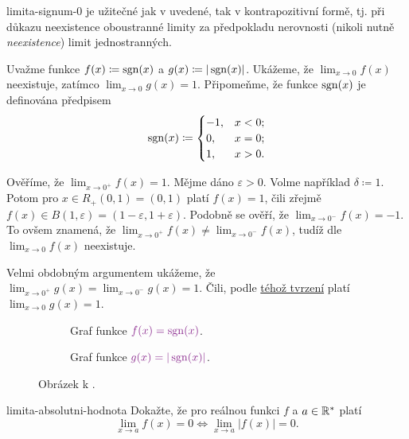 \begin{example}{}{limita-signum-0}
  je užitečné
 jak v uvedené, tak v kontrapozitivní formě, tj. při důkazu neexistence
 oboustranné limity za předpokladu nerovnosti (nikoli nutně \emph{neexistence})
 limit jednostranných.

 Uvažme funkce $f(x) \coloneqq \operatorname{sgn}(x)$ a $g(x) \coloneqq |\operatorname{sgn}(x)|$. Ukážeme,
 že $\lim_{x \to 0} f(x)$ neexistuje, zatímco $\lim_{x \to 0} g(x) = 1$.
 Připomeňme, že funkce $\operatorname{sgn}(x)$ je definována předpisem
 \[
  \operatorname{sgn}(x) \coloneqq \begin{cases}
   -1, & x < 0;\\
   0, & x = 0;\\
   1, & x > 0.
  \end{cases}
 \]

 Ověříme, že $\lim_{x \to 0^{+}} f(x) = 1$. Mějme dáno $\varepsilon>0$. Volme
 například $\delta \coloneqq 1$. Potom pro $x \in R_+(0,1) = (0,1)$ platí $f(x)
 = 1$, čili zřejmě $f(x) \in B(1,\varepsilon) = (1-\varepsilon,1+\varepsilon)$.
 Podobně se ověří, že $\lim_{x \to 0^{-}} f(x) = -1$. To ovšem znamená, že
 $\lim_{x \to 0^{+}} f(x) \neq \lim_{x \to 0^{-}} f(x)$, tudíž dle
  $\lim_{x \to
 0} f(x)$ neexistuje.

 Velmi obdobným argumentem ukážeme, že $\lim_{x \to 0^{+}} g(x) = \lim_{x \to
 0^{-}} g(x) = 1$. Čili, podle
 \hyperref[prop:vztah-jednostrannych-a-oboustrannych-limit]{téhož tvrzení} platí
 $\lim_{x \to 0} g(x) = 1$.
\end{example}

\begin{figure}[ht]
 \centering
 \begin{subfigure}[b]{0.49\textwidth}
  \centering
  \caption{Graf funkce $\clm{f(x) = \sign(x)}$.}
 \end{subfigure}
 \begin{subfigure}[b]{0.49\textwidth}
  \centering
  \caption{Graf funkce $\clm{g(x) = |\sign(x)|}$.}
 \end{subfigure}
 \caption{Obrázek k .}
 \label{fig:limita-signum-0}
\end{figure}

\begin{exercise}{}{limita-absolutni-hodnota}
 Dokažte, že pro reálnou funkci $f$ a $a \in \mathbb{R}^{*}$ platí
 \[
  \lim_{x \to a} f(x) = 0 \Leftrightarrow \lim_{x \to a} |f(x)| = 0.
 \]
\end{exercise}


